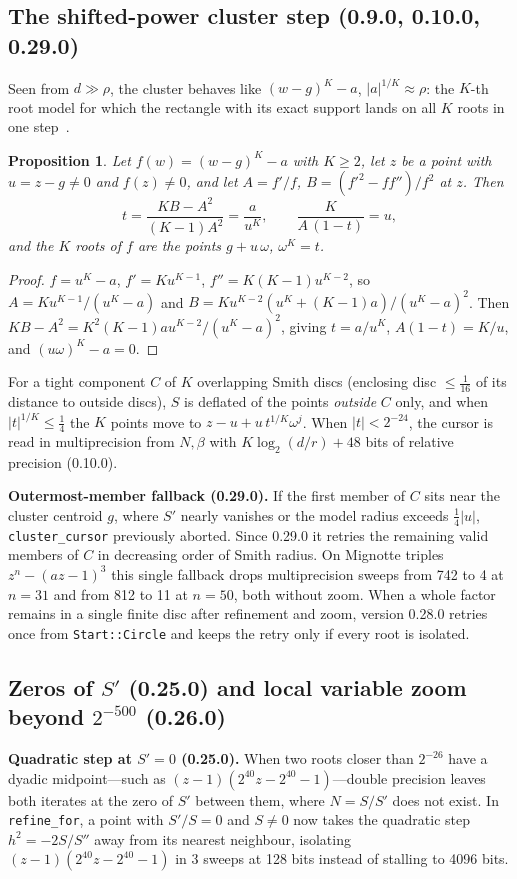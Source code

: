 \documentclass[10pt,a4paper]{article}
\newtheorem{proposition}[theorem]{Proposition}
\theoremstyle{definition}
\numberwithin{equation}{section}
\begin{document}
\subsection{The shifted-power cluster step (0.9.0, 0.10.0, 0.29.0)}
Seen from $d\gg\rho$, the cluster behaves like $(w-g)^K-a$, $|a|^{1/K}\approx\rho$: the $K$-th root model for which the rectangle with its exact support lands on all $K$ roots in one step~\cite{c5}.

\begin{proposition}\label{prop:cluster}
Let $f(w)=(w-g)^K-a$ with $K\ge2$, let $z$ be a point with $u=z-g\ne0$ and $f(z)\ne0$, and let $A=f'/f$, $B=(f'^2-ff'')/f^2$ at $z$. Then
\begin{equation}\label{eq:cluster}
 t=\frac{KB-A^2}{(K-1)A^2}=\frac{a}{u^K},\qquad \frac{K}{A\,(1-t)}=u,
\end{equation}
and the $K$ roots of $f$ are the points $g+u\,\omega$, $\omega^K=t$.
\end{proposition}
\begin{proof}
$f=u^K-a$, $f'=Ku^{K-1}$, $f''=K(K-1)u^{K-2}$, so $A=Ku^{K-1}/(u^K-a)$ and $B=Ku^{K-2}(u^K+(K-1)a)/(u^K-a)^2$. Then $KB-A^2=K^2(K-1)au^{K-2}/(u^K-a)^2$, giving $t=a/u^K$, $A(1-t)=K/u$, and $(u\omega)^K-a=0$.
\end{proof}

For a tight component $C$ of $K$ overlapping Smith discs (enclosing disc $\le\frac1{16}$ of its distance to outside discs), $S$ is deflated of the points \emph{outside} $C$ only, and when $|t|^{1/K}\le\frac14$ the $K$ points move to $z-u+u\,t^{1/K}\omega^j$. When $|t|<2^{-24}$, the cursor is read in multiprecision from $N,\beta$ with $K\log_2(d/r)+48$ bits of relative precision (0.10.0).

\textbf{Outermost-member fallback (0.29.0).}
If the first member of $C$ sits near the cluster centroid $g$, where $S'$ nearly vanishes or the model radius exceeds $\frac14|u|$, \texttt{cluster\_cursor} previously aborted. Since 0.29.0 it retries the remaining valid members of $C$ in decreasing order of Smith radius. On Mignotte triples $z^n-(a z-1)^3$ this single fallback drops multiprecision sweeps from 742 to 4 at $n=31$ and from 812 to 11 at $n=50$, both without zoom. When a whole factor remains in a single finite disc after refinement and zoom, version 0.28.0 retries once from \texttt{Start::Circle} and keeps the retry only if every root is isolated.

\subsection{Zeros of $S'$ (0.25.0) and local variable zoom beyond $2^{-500}$ (0.26.0)}
\textbf{Quadratic step at $S'=0$ (0.25.0).}
When two roots closer than $2^{-26}$ have a dyadic midpoint---such as $(z-1)(2^{40}z-2^{40}-1)$---double precision leaves both iterates at the zero of $S'$ between them, where $N=S/S'$ does not exist. In \texttt{refine\_for}, a point with $S'/S=0$ and $S\ne0$ now takes the quadratic step $h^2=-2S/S''$ away from its nearest neighbour, isolating $(z-1)(2^{40}z-2^{40}-1)$ in 3 sweeps at 128 bits instead of stalling to 4096 bits.
\end{document}
